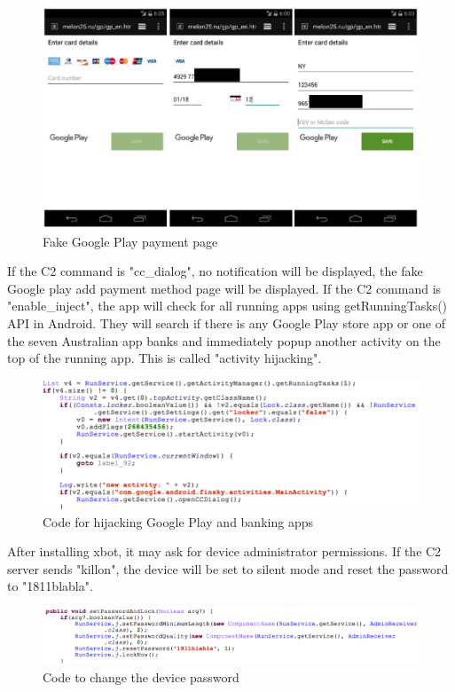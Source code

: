 \begin{figure}[H]
\centering
\includegraphics[scale=0.5]{xbot4}
\caption{Fake Google Play payment page}
\label{fig:ra}
\end{figure}

If the C2 command is "cc\_dialog", no notification will be displayed, the fake Google play add payment method page will be displayed.
If the C2 command is "enable\_inject", the app will check for all running apps using getRunningTasks() API in Android. 
They will search if there is any Google Play store app or one of the seven Australian app banks and immediately popup another activity on the top of the running app. 
This is called "activity hijacking".


\begin{figure}[H]
\centering
\includegraphics[scale=0.8]{xbot6}
\caption{Code for hijacking Google Play and banking apps}
\label{fig:ra}
\end{figure}

After installing xbot, it may ask for device administrator permissions.
If the C2 server sends "killon", the device will be set to silent mode and reset the password to "1811blabla".


\begin{figure}[H]
\centering
\includegraphics[scale=0.8]{xbot9}
\caption{Code to change the device password}
\label{fig:ra}
\end{figure}

